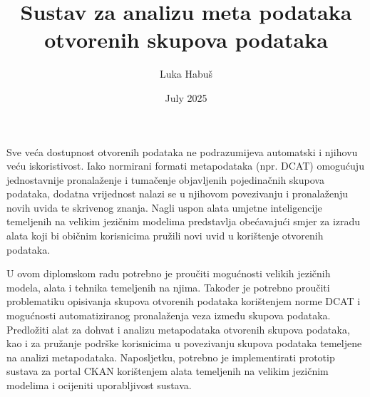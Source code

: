 \documentclass[diplomskirad]{fer}
\title{Sustav za analizu meta podataka otvorenih skupova podataka}
\author{Luka Habuš}
\date{July 2025}
\begin{document}
\maketitle



\begin{zahvale}
\end{zahvale}

\mainmatter

\tableofcontents











\begin{sazetak}
Sve veća dostupnost otvorenih podataka ne podrazumijeva automatski i njihovu veću iskoristivost. Iako normirani formati metapodataka (npr. DCAT) omogućuju jednostavnije pronalaženje i tumačenje objavljenih pojedinačnih skupova podataka, dodatna vrijednost nalazi se u njihovom povezivanju i pronalaženju novih uvida te skrivenog znanja. Nagli uspon alata umjetne inteligencije temeljenih na velikim jezičnim modelima predstavlja obećavajući smjer za izradu alata koji bi običnim korisnicima pružili novi uvid u korištenje otvorenih podataka.

U ovom diplomskom radu potrebno je proučiti mogućnosti velikih jezičnih modela, alata i tehnika temeljenih na njima. Također je potrebno proučiti problematiku opisivanja skupova otvorenih podataka korištenjem norme DCAT i mogućnosti automatiziranog pronalaženja veza između skupova podataka. Predložiti alat za dohvat i analizu metapodataka otvorenih skupova podataka, kao i za pružanje podrške korisnicima u povezivanju skupova podataka temeljene na analizi metapodataka. Naposljetku, potrebno je implementirati prototip sustava za portal CKAN korištenjem alata temeljenih na velikim jezičnim modelima i ocijeniti uporabljivost sustava.
\end{sazetak}
\end{document}
